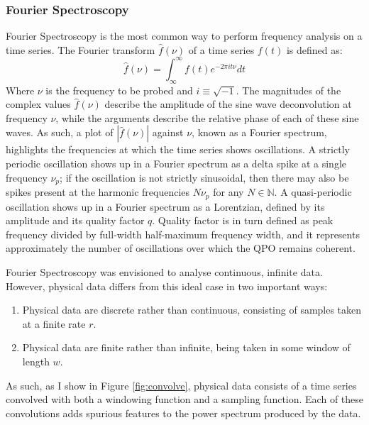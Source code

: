\subsubsection{Fourier Spectroscopy}

\par Fourier Spectroscopy \citep{Fourier} is the most common way to perform frequency analysis on a time series.  The Fourier transform $\hat{f}(\nu)$ of a time series $f(t)$ is defined as:
\begin{equation}
\hat{f}(\nu)=\int_\infty^\infty f(t)e^{-2\pi it\nu} dt
\end{equation}
Where $\nu$ is the frequency to be probed and $i\equiv\sqrt{-1}$.  The magnitudes of the complex values $\hat{f}(\nu)$ describe the amplitude of the sine wave deconvolution at frequency $\nu$, while the arguments describe the relative phase of each of these sine waves.  As such, a plot of $|\hat{f}(\nu)|$ against $\nu$, known as a Fourier spectrum, highlights the frequencies at which the time series shows oscillations.  A strictly periodic oscillation shows up in a Fourier spectrum as a delta spike at a single frequency $\nu_p$; if the oscillation is not strictly sinusoidal, then there may also be spikes present at the harmonic frequencies $N\nu_p$ for any $N\in\mathbb{N}$.  A quasi-periodic oscillation shows up in a Fourier spectrum as a Lorentzian, defined by its amplitude and its quality factor $q$.  Quality factor is in turn defined as peak frequency divided by full-width half-maximum frequency width, and it represents approximately the number of oscillations over which the QPO remains coherent.
\par Fourier Spectroscopy was envisioned to analyse continuous, infinite data.  However, physical data differs from this ideal case in two important ways:
\begin{enumerate}
\item Physical data are discrete rather than continuous, consisting of samples taken at a finite rate $r$.
\item Physical data are finite rather than infinite, being taken in some window of length $w$.
\end{enumerate}
As such, as I show in Figure \ref{fig:convolve}, physical data consists of a time series convolved with both a windowing function and a sampling function.  Each of these convolutions adds spurious features to the power spectrum produced by the data.

